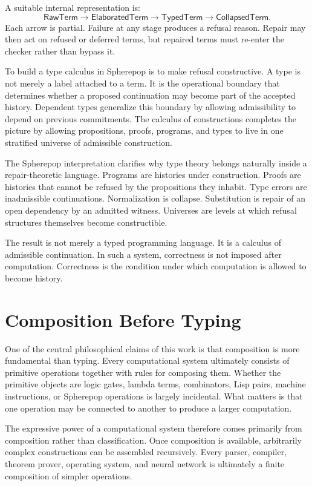 \documentclass[12pt,oneside]{article}
\begin{document}
A suitable internal representation is:
\[
\mathsf{RawTerm}
\to
\mathsf{ElaboratedTerm}
\to
\mathsf{TypedTerm}
\to
\mathsf{CollapsedTerm}.
\]
Each arrow is partial. Failure at any stage produces a refusal reason. Repair may then act on refused or deferred terms, but repaired terms must re-enter the checker rather than bypass it.

To build a type calculus in Spherepop is to make refusal constructive. A type is not merely a label attached to a term. It is the operational boundary that determines whether a proposed continuation may become part of the accepted history. Dependent types generalize this boundary by allowing admissibility to depend on previous commitments. The calculus of constructions completes the picture by allowing propositions, proofs, programs, and types to live in one stratified universe of admissible construction.

The Spherepop interpretation clarifies why type theory belongs naturally inside a repair-theoretic language. Programs are histories under construction. Proofs are histories that cannot be refused by the propositions they inhabit. Type errors are inadmissible continuations. Normalization is collapse. Substitution is repair of an open dependency by an admitted witness. Universes are levels at which refusal structures themselves become constructible.

The result is not merely a typed programming language. It is a calculus of admissible continuation. In such a system, correctness is not imposed after computation. Correctness is the condition under which computation is allowed to become history.

\section{Composition Before Typing}

One of the central philosophical claims of this work is that composition is more fundamental than typing. Every computational system ultimately consists of primitive operations together with rules for composing them. Whether the primitive objects are logic gates, lambda terms, combinators, Lisp pairs, machine instructions, or Spherepop operations is largely incidental. What matters is that one operation may be connected to another to produce a larger computation.

The expressive power of a computational system therefore comes primarily from composition rather than classification. Once composition is available, arbitrarily complex constructions can be assembled recursively. Every parser, compiler, theorem prover, operating system, and neural network is ultimately a finite composition of simpler operations.
\end{document}
